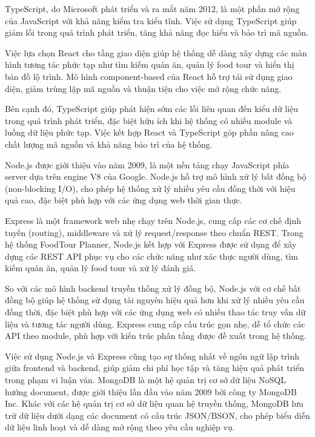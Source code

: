 TypeScript, do Microsoft phát triển và ra mắt năm 2012, là một phần mở rộng của JavaScript với khả năng kiểm tra kiểu tĩnh. Việc sử dụng TypeScript giúp giảm lỗi trong quá trình phát triển, tăng khả năng đọc hiểu và bảo trì mã nguồn.

Việc lựa chọn React cho tầng giao diện giúp hệ thống dễ dàng xây dựng các màn hình
tương tác phức tạp như tìm kiếm quán ăn, quản lý food tour và hiển thị bản đồ lộ trình.
Mô hình component-based của React hỗ trợ tái sử dụng giao diện, giảm trùng lặp mã nguồn
và thuận tiện cho việc mở rộng chức năng.

Bên cạnh đó, TypeScript giúp phát hiện sớm các lỗi liên quan đến kiểu dữ liệu trong quá
trình phát triển, đặc biệt hữu ích khi hệ thống có nhiều module và luồng dữ liệu phức tạp.
Việc kết hợp React và TypeScript góp phần nâng cao chất lượng mã nguồn và khả năng
bảo trì của hệ thống.

Node.js được giới thiệu vào năm 2009, là một nền tảng chạy JavaScript phía server dựa trên engine V8 của Google. Node.js hỗ trợ mô hình xử lý bất đồng bộ (non-blocking I/O), cho phép hệ thống xử lý nhiều yêu cầu đồng thời với hiệu quả cao, đặc biệt phù hợp với các ứng dụng web thời gian thực.

Express là một framework web nhẹ chạy trên Node.js, cung cấp các cơ chế định tuyến (routing), middleware và xử lý request/response theo chuẩn REST. Trong hệ thống FoodTour Planner, Node.js kết hợp với Express được sử dụng để xây dựng các REST API phục vụ cho các chức năng như xác thực người dùng, tìm kiếm quán ăn, quản lý food tour và xử lý đánh giá.

So với các mô hình backend truyền thống xử lý đồng bộ, Node.js với cơ chế bất đồng bộ
giúp hệ thống sử dụng tài nguyên hiệu quả hơn khi xử lý nhiều yêu cầu đồng thời, đặc biệt
phù hợp với các ứng dụng web có nhiều thao tác truy vấn dữ liệu và tương tác người dùng.
Express cung cấp cấu trúc gọn nhẹ, dễ tổ chức các API theo module, phù hợp với kiến trúc
phân tầng được đề xuất trong hệ thống.

Việc sử dụng Node.js và Express cũng tạo sự thống nhất về ngôn ngữ lập trình giữa frontend
và backend, giúp giảm chi phí học tập và tăng hiệu quả phát triển trong phạm vi luận văn.
MongoDB là một hệ quản trị cơ sở dữ liệu NoSQL hướng document, được giới thiệu lần đầu
vào năm 2009 bởi công ty MongoDB Inc. Khác với các hệ quản trị cơ sở dữ liệu quan hệ
truyền thống, MongoDB lưu trữ dữ liệu dưới dạng các document có cấu trúc JSON/BSON,
cho phép biểu diễn dữ liệu linh hoạt và dễ dàng mở rộng theo yêu cầu nghiệp vụ.

